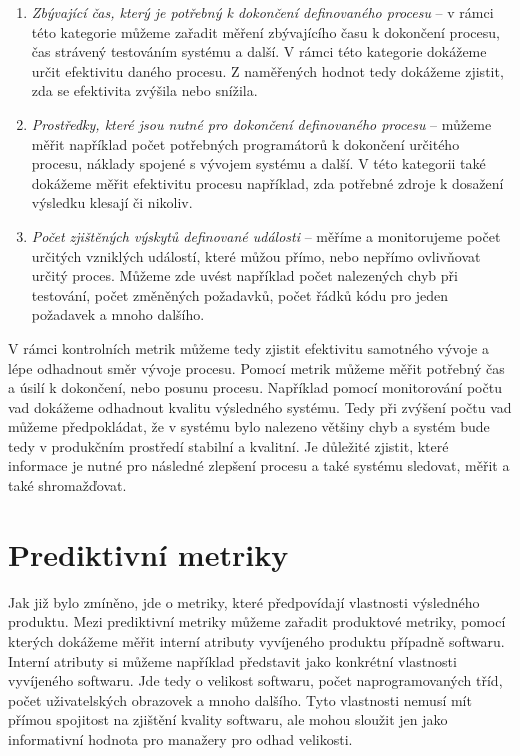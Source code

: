 \documentclass[czech,master]{diploma}
\begin{document}
\begin{enumerate}
\item \textit{Zbývající čas, který je potřebný k dokončení definovaného procesu} -- v rámci této kategorie můžeme zařadit měření zbývajícího času k dokončení procesu, čas strávený testováním systému a další. V rámci této kategorie dokážeme určit efektivitu daného procesu. Z naměřených hodnot tedy dokážeme zjistit, zda se efektivita zvýšila nebo snížila.

\item \textit{Prostředky, které jsou nutné pro dokončení definovaného procesu} -- můžeme měřit například počet potřebných programátorů k dokončení určitého procesu, náklady spojené s vývojem systému a další. V této kategorii také dokážeme měřit efektivitu procesu například, zda potřebné zdroje k dosažení výsledku klesají či nikoliv.

\item \textit{Počet zjištěných výskytů definované události} -- měříme a monitorujeme počet určitých vzniklých událostí, které můžou přímo, nebo nepřímo ovlivňovat určitý proces. Můžeme zde uvést například počet nalezených chyb při testování, počet změněných požadavků, počet řádků kódu pro jeden požadavek a mnoho dalšího.

\end{enumerate}

V rámci kontrolních metrik můžeme tedy zjistit efektivitu samotného vývoje a lépe odhadnout směr vývoje procesu. Pomocí metrik můžeme měřit potřebný čas a úsilí k dokončení, nebo posunu procesu. Například pomocí monitorování počtu vad dokážeme odhadnout kvalitu výsledného systému. Tedy při zvýšení počtu vad můžeme předpokládat, že v systému bylo nalezeno většiny chyb a systém bude tedy v produkčním prostředí stabilní a kvalitní. Je důležité zjistit, které informace je nutné pro následné zlepšení procesu a také systému sledovat, měřit a také shromažďovat.

\section{Prediktivní metriky}
Jak již bylo zmíněno, jde o metriky, které předpovídají vlastnosti výsledného produktu. Mezi prediktivní metriky můžeme zařadit produktové metriky, pomocí kterých dokážeme měřit interní atributy vyvíjeného produktu případně softwaru. Interní atributy si můžeme například představit jako konkrétní vlastnosti vyvíjeného softwaru. Jde tedy o velikost softwaru, počet naprogramovaných tříd, počet uživatelských obrazovek a mnoho dalšího. Tyto vlastnosti nemusí mít přímou spojitost na zjištění kvality softwaru, ale mohou sloužit jen jako informativní hodnota pro manažery pro odhad velikosti.
\end{document}
